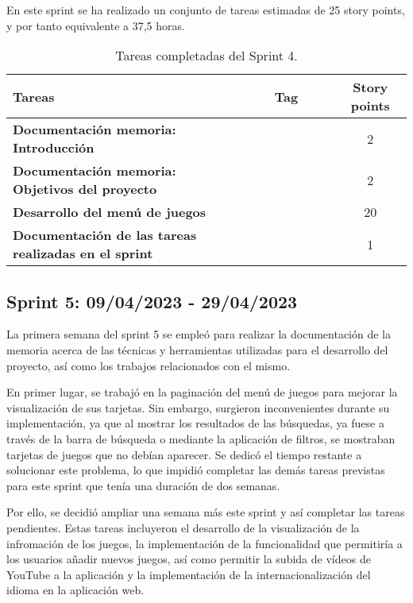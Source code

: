 En este sprint se ha realizado un conjunto de tareas estimadas de 25 story points, y por tanto equivalente a 37,5 horas.

\begin{table}[ht!]
    \centering
    \resizebox{15cm}{!} {
    \begin{tabular}{|l|c|c|}
    \hline
    \rowcolor[rgb]{0.99,0.93,0.93}
    \textbf{Tareas}     &\textbf{Tag}     & \textbf{Story points} \\ \hline
    \textbf{Documentación memoria: Introducción}          &\cellcolor[rgb]{0.0,0.33,0.71}\textcolor{white}{documentation}      &2 \\ \hline 
    \textbf{Documentación memoria: Objetivos del proyecto}          &\cellcolor[rgb]{0.0,0.33,0.71}\textcolor{white}{documentation}      &2 \\ \hline 
    \textbf{Desarrollo del menú de juegos}         &\cellcolor[rgb]{0.99,0.83,0.93}\textcolor{white}{development}      &20 \\ \hline 
    \textbf{Documentación de las tareas realizadas en el sprint}         &\cellcolor[rgb]{0.0,0.33,0.71}\textcolor{white}{documentation}      &1 \\ \hline 
    \end{tabular}}
    \caption{Tareas completadas del Sprint 4.}
    \label{tab:my_label}
\end{table}

\subsection{Sprint 5: 09/04/2023 - 29/04/2023}
La primera semana del sprint 5 se empleó para realizar la documentación de la memoria acerca de las técnicas y herramientas utilizadas para el desarrollo del proyecto, así como los trabajos relacionados con el mismo.

En primer lugar, se trabajó en la paginación del menú de juegos para mejorar la visualización de sus tarjetas. Sin embargo, surgieron inconvenientes durante su implementación, ya que al mostrar los resultados de las búsquedas, ya fuese a través de la barra de búsqueda o mediante la aplicación de filtros, se mostraban tarjetas de juegos que no debían aparecer. Se dedicó el tiempo restante a solucionar este problema, lo que impidió completar las demás tareas previstas para este sprint que tenía una duración de dos semanas.

Por ello, se decidió ampliar una semana más este sprint y así completar las tareas pendientes. Estas tareas incluyeron el desarrollo de la visualización de la infromación de los juegos, la implementación de la funcionalidad que permitiría a los usuarios añadir nuevos juegos, así como permitir la subida de vídeos de YouTube a la aplicación y la implementación de la internacionalización del idioma en la aplicación web.

